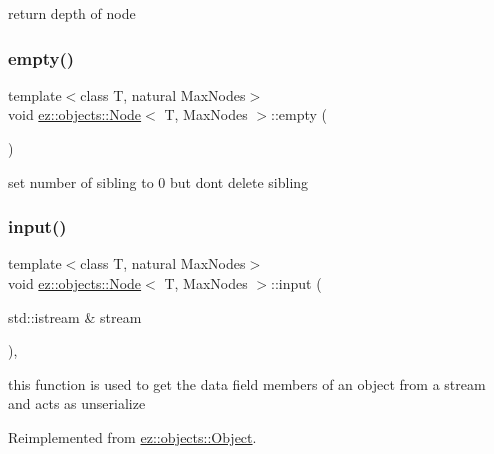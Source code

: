 return depth of node \mbox{\label{classez_1_1objects_1_1Node_ae9b583e4373ecc7bf70ce30566c0817d}} 
\subsubsection{\texorpdfstring{empty()}{empty()}}
{\footnotesize\ttfamily template$<$class T, natural Max\+Nodes$>$ \\
void \hyperlink{classez_1_1objects_1_1Node}{ez\+::objects\+::\+Node}$<$ T, Max\+Nodes $>$\+::empty (\begin{DoxyParamCaption}{ }\end{DoxyParamCaption})\hspace{0.3cm}{\ttfamily [inline]}}

set number of sibling to 0 but don\textquotesingle{}t delete sibling \mbox{\label{classez_1_1objects_1_1Node_a637eb76e0f2597e92c5f827b80bff0ca}} 
\subsubsection{\texorpdfstring{input()}{input()}}
{\footnotesize\ttfamily template$<$class T, natural Max\+Nodes$>$ \\
void \hyperlink{classez_1_1objects_1_1Node}{ez\+::objects\+::\+Node}$<$ T, Max\+Nodes $>$\+::input (\begin{DoxyParamCaption}\item[{std\+::istream \&}]{stream }\end{DoxyParamCaption})\hspace{0.3cm}{\ttfamily [inline]}, {\ttfamily [virtual]}}

this function is used to get the data field members of an object from a stream and acts as unserialize 

Reimplemented from \hyperlink{classez_1_1objects_1_1Object_a878bdc53b7f16fda6fa15dab214c4b6a}{ez\+::objects\+::\+Object}.

\mbox{\label{classez_1_1objects_1_1Node_a5aff43ff4a0189a4a170e98c5c07e02e}} 
